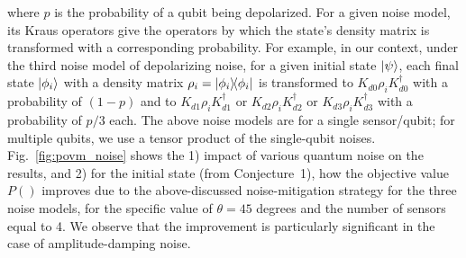 where $p$ is the probability of a qubit being depolarized.
For a given noise model, its Kraus operators give the operators by which the state's density matrix is transformed with a corresponding probability. 
For example, in our context, under the third noise model of depolarizing noise, for a given initial state $\ket{\psi}$, 
each final state $\ket{\phi_i}$ with a density matrix $\rho_i = \ketbra{\phi_i}$ is transformed to $K_{d0}\rho_i K^{\dagger}_{d0}$ with a probability of $(1-p)$ and to $K_{d1}\rho_i K^{\dagger}_{d1}$ or $K_{d2}\rho_i K^{\dagger}_{d2}$ or 
$K_{d3}\rho_i K^{\dagger}_{d3}$ with a 
probability of $p/3$ each.
The above noise models are for a single sensor/qubit; 
for multiple qubits, we use a tensor product of the single-qubit noises.
Fig.~\ref{fig:povm_noise} shows the 1) impact of various quantum noise on the results, and 2) for the initial state (from Conjecture~1),
how the objective value $P()$ improves due to the above-discussed noise-mitigation strategy for the three noise models, for the specific value of $\theta = 45$ degrees and the number of sensors equal to 4.
We observe that the improvement is particularly significant in the case of amplitude-damping noise.





